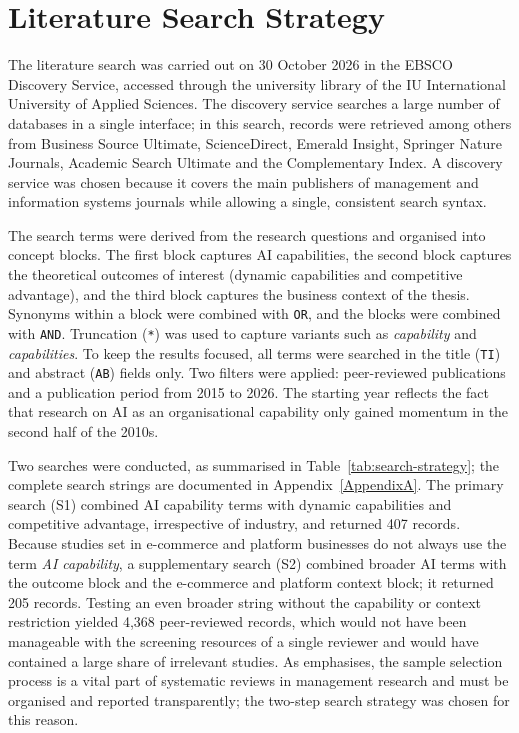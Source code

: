 \section{Literature Search Strategy}
\label{sec:search}

The literature search was carried out on 30 October 2026 in the EBSCO Discovery Service, accessed through the university library of the IU International University of Applied Sciences. The discovery service searches a large number of databases in a single interface; in this search, records were retrieved among others from Business Source Ultimate, ScienceDirect, Emerald Insight, Springer Nature Journals, Academic Search Ultimate and the Complementary Index. A discovery service was chosen because it covers the main publishers of management and information systems journals while allowing a single, consistent search syntax.

The search terms were derived from the research questions and organised into concept blocks. The first block captures AI capabilities, the second block captures the theoretical outcomes of interest (dynamic capabilities and competitive advantage), and the third block captures the business context of the thesis. Synonyms within a block were combined with \texttt{OR}, and the blocks were combined with \texttt{AND}. Truncation (\texttt{*}) was used to capture variants such as \emph{capability} and \emph{capabilities}. To keep the results focused, all terms were searched in the title (\texttt{TI}) and abstract (\texttt{AB}) fields only. Two filters were applied: peer-reviewed publications and a publication period from 2015 to 2026. The starting year reflects the fact that research on AI as an organisational capability only gained momentum in the second half of the 2010s.

Two searches were conducted, as summarised in Table~\ref{tab:search-strategy}; the complete search strings are documented in Appendix~\ref{AppendixA}. The primary search (S1) combined AI capability terms with dynamic capabilities and competitive advantage, irrespective of industry, and returned 407 records. Because studies set in e-commerce and platform businesses do not always use the term \emph{AI capability}, a supplementary search (S2) combined broader AI terms with the outcome block and the e-commerce and platform context block; it returned 205 records. Testing an even broader string without the capability or context restriction yielded 4,368 peer-reviewed records, which would not have been manageable with the screening resources of a single reviewer and would have contained a large share of irrelevant studies. As \textcite[229]{hiebl2023} emphasises, the sample selection process is a vital part of systematic reviews in management research and must be organised and reported transparently; the two-step search strategy was chosen for this reason.

